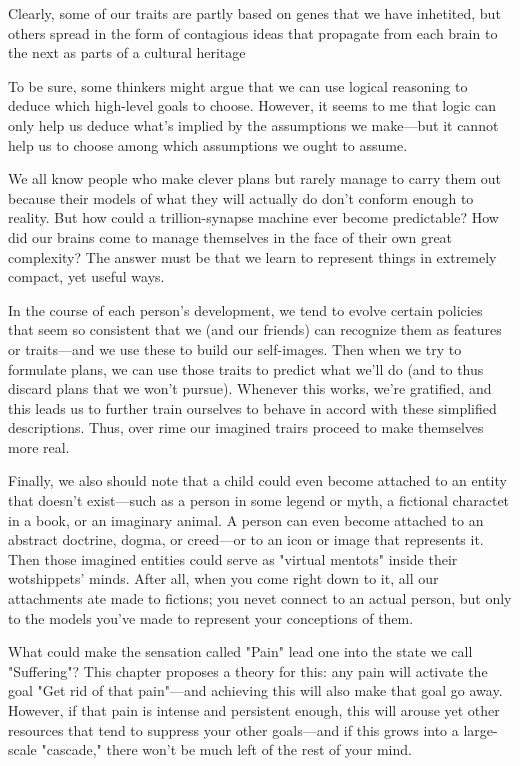\documentclass[10pt,a4paper]{article}
\begin{document}
Clearly, some of our traits are partly based on genes that we have inhetited, but others spread in the form of contagious ideas that propagate from each brain to the next as parts of a cultural heritage \cite[p.~51]{minsky}

To be sure, some thinkers might argue that we can use logical reasoning to deduce which high-level goals to choose. However, it seems to me that logic can only help us deduce what's implied by the assumptions we make—but it cannot help us to choose among which assumptions we ought to assume. \cite[p.~52]{minsky}

We all know people who make clever plans but rarely manage to carry them out because their models of what they will actually do don't conform enough to reality. But how could a trillion-synapse machine ever become predictable? How did our brains come to manage themselves in the face of their own great complexity? The answer must be that we learn to represent things in extremely compact, yet useful ways. \cite[p.~60]{minsky}

In the course of each person's development, we tend to evolve certain policies that seem so consistent that we (and our friends) can recognize them as features or traits—and we use these to build our self-images. Then when we try to formulate plans, we can use those traits to predict what we'll do (and to thus discard plans that we won't pursue). Whenever this works, we're gratified, and this leads us to further train ourselves to behave in accord with these simplified descriptions. Thus, over rime our imagined trairs proceed to make themselves more real. \cite[p.~61]{minsky}

Finally, we also should note that a child could even become attached to an entity that doesn't exist—such as a person in some legend or myth, a fictional charactet in a book, or an imaginary animal. A person can even become attached to an abstract doctrine, dogma, or creed—or to an icon or image that represents it. Then those imagined entities could serve as "virtual mentots" inside their wotshippets' minds. After all, when you come right down to it, all our attachments ate made to fictions; you nevet connect to an actual person, but only to the models you've made to represent your conceptions of them. \cite[p.~65]{minsky}

What could make the sensation called "Pain" lead one into the state we call "Suffering"? This chapter proposes a theory for this: any pain will activate the goal "Get rid of that pain"—and achieving this will also make that goal go away. However, if that pain is intense and persistent enough, this will arouse yet other resources that tend to suppress your other goals—and if this grows into a large-scale "cascade," there won't be much left of the rest of your mind. \cite[p.~66]{minsky}
\end{document}

